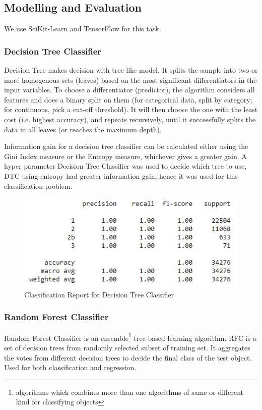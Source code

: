 \documentclass{article}
\begin{document}
\subsection{Modelling and Evaluation}

We use SciKit-Learn and TensorFlow for this task.

\subsubsection{Decision Tree Classifier}

Decision Tree makes decision with tree-like model. It splits the sample into two or more homogenous sets (leaves) based on the most significant differentiators in the input variables. To choose a differentiator (predictor), the algorithm considers all features and does a binary split on them (for categorical data, split by category; for continuous, pick a cut-off threshold). It will then choose the one with the least cost (i.e. highest accuracy), and repeats recursively, until it successfully splits the data in all leaves (or reaches the maximum depth).

Information gain for a decision tree classifier can be calculated either using the Gini Index measure or the Entropy measure, whichever gives a greater gain. A hyper parameter Decision Tree Classifier was used to decide which tree to use, DTC using entropy had greater information gain; hence it was used for this classification problem.

\begin{figure}[h]
  \centering
  \includegraphics[scale=0.8]{dtcreport.jpg}
  \caption{Classification Report for Decision Tree Classifier}
\end{figure}

\subsubsection{Random Forest Classifier}

Random Forest Classifier is an ensemble\footnote{algorithms which combines more than one algorithms of same or different kind for classifying objects} tree-based learning algorithm. RFC is a set of decision trees from randomly selected subset of training set. It aggregates the votes from different decision trees to decide the final class of the test object. Used for both classification and regression.
\end{document}
